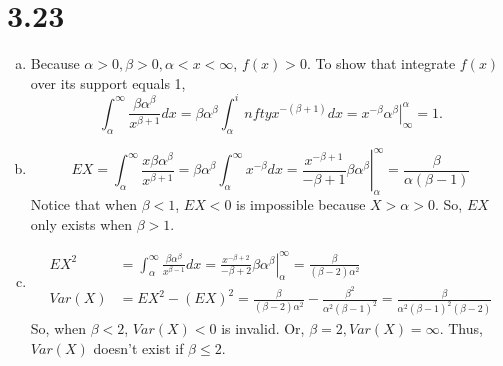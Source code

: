 \documentclass[letter]{article}
\begin{document}
    \section*{3.23}
    \begin{enumerate}[(a)]
        \item Because $\alpha > 0, \beta > 0, \alpha < x < \infty$, $f(x) > 0$.
        To show that integrate $f(x)$ over its support equals 1, 
        \[
        \int_\alpha^\infty \frac{\beta \alpha^\beta}{x^{\beta+1}} dx = \beta \alpha^\beta \int_\alpha^infty x^{-(\beta+1)} dx = \left. x^{-\beta} \alpha^\beta \right|^\alpha_\infty = 1.
        \]
        \item
        \[
        EX = \int_\alpha^\infty \frac{x \beta \alpha^\beta}{x^{\beta+1}} = 
        \beta \alpha^\beta \int_\alpha^\infty x^{-\beta} dx = \left. \frac{x^{-\beta+1}}{-\beta+1} \beta \alpha^\beta \right|^\infty_\alpha = \frac{\beta}{\alpha(\beta-1)}
        \]
        Notice that when $\beta < 1$, $EX < 0$ is impossible because $X > \alpha > 0$. So, $EX$ only exists when $\beta > 1$.
        \item 
        \begin{align*}
        EX^2 & = \int_\alpha^\infty \frac{\beta \alpha^\beta}{x^{\beta-1}} dx =
        \left. \frac{x^{-\beta+2}}{-\beta+2} \beta \alpha^\beta \right|_\alpha^\infty = \frac{\beta}{(\beta-2)\alpha^2} \\
        Var(X) &= EX^2 - (EX)^2 = \frac{\beta}{(\beta-2)\alpha^2} - \frac{\beta^2}{\alpha^2 (\beta-1)^2} = \frac{\beta}{\alpha^2 (\beta-1)^2 (\beta-2)}
        \end{align*}
        So, when $\beta < 2$, $Var(X) < 0$ is invalid. Or, $\beta = 2, Var(X) = \infty$. Thus, $Var(X)$ doesn't exist if $\beta \le 2$.
    \end{enumerate}
\end{document}
